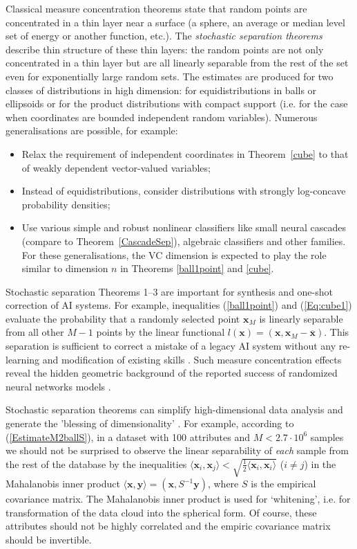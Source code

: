 \documentclass[final,5p,times,twocolumn]{elsarticle}
\begin{document}
Classical measure concentration theorems state that random points are concentrated in a thin layer near a surface (a sphere, an average or median level set of energy or another function, etc.).
The {\em stochastic separation theorems} describe  thin structure of these thin layers: the random  points are not only concentrated in a thin layer but are all linearly separable from the rest of the set even for exponentially large random sets. The estimates are produced for two classes of distributions in high dimension: for equidistributions in balls or ellipsoids or for the product distributions with compact support (i.e. for the case when coordinates are bounded independent random variables).  Numerous generalisations are possible, for example:
\begin{itemize}
\item Relax the requirement of independent coordinates in Theorem~\ref{cube} to that of weakly dependent vector-valued variables;
\item Instead of equidistributions, consider distributions with strongly log-concave probability  densities;
\item Use various simple and robust nonlinear classifiers like small neural cascades (compare to Theorem~\ref{CascadeSep}), algebraic classifiers and other families. For these generalisations, the VC dimension is expected to play the  role similar to  dimension $n$ in Theorems \ref{ball1point} and \ref{cube}.
\end{itemize}

Stochastic separation Theorems 1--3 are important for synthesis and one-shot correction of AI systems. For example, inequalities (\ref{ball1point}) and (\ref{Eq:cube1}) evaluate the probability that a randomly selected point $\boldsymbol{x}_M$ is linearly separable from all other $M-1$ points by the linear functional $l(\boldsymbol{x})=(\boldsymbol{x},\boldsymbol{x}_M-\overline{\boldsymbol{x}})$. This separation is sufficient to correct a mistake of a legacy AI system without any re-learning and modification of existing skills \citep{GorbanRomBurtTyu2016}. Such measure concentration effects reveal the hidden geometric background of the reported success of randomized neural networks models \citep{ScardapaneWang2017}.

Stochastic separation theorems can simplify high-dimensional data analysis and generate the 'blessing of dimensionality' \citep{GorbanTyuRom2016}.  For example, according to (\ref{EstimateM2ballS}), in a dataset with 100 attributes and $M<2.7\cdot 10^6$ samples we should not be surprised to observe the  linear separability of {\em each} sample from the rest of the database by the inequalities $\langle \boldsymbol{x}_i,\boldsymbol{x}_j\rangle<\sqrt{\frac{1}{2}\langle\boldsymbol{x}_i,\boldsymbol{x}_i\rangle}$ ($i\neq j$) in the Mahalanobis inner product $\langle \boldsymbol{x}, \boldsymbol{y}\rangle =(\boldsymbol{x}, S^{-1}\boldsymbol{y})$, where $S$ is the empirical covariance matrix. The Mahalanobis inner product is used for `whitening', i.e. for transformation of the data cloud into the spherical form. Of course, these attributes should not be highly correlated and the empiric covariance matrix  should be invertible.
\end{document}
